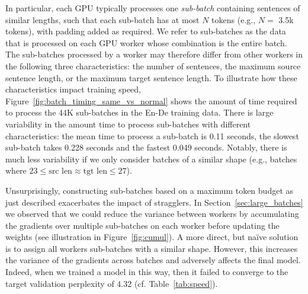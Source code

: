 \documentclass[11pt,a4paper]{article}
\begin{document}
In particular, each GPU typically processes one \emph{sub-batch} containing sentences of similar lengths, such that each sub-batch has at most $N$ tokens (e.g., $N =$ 3.5k tokens), with padding added as required. We refer to sub-batches as the data that is processed on each GPU worker whose combination is the entire batch.
The sub-batches processed by a worker may therefore differ from other workers in the following three characteristics: the number of sentences, the maximum source sentence length, or the maximum target sentence length.
To illustrate how these characteristics impact training speed, Figure~\ref{fig:batch_timing_same_vs_normal} shows the amount of time required to process the 44K sub-batches in the En-De training data.
There is large variability in the amount time to process sub-batches with different characteristics: the mean time to process a sub-batch is 0.11 seconds, the slowest sub-batch takes 0.228 seconds and the fastest 0.049 seconds.
Notably, there is much less variability if we only consider batches of a similar shape (e.g., batches where $23 \le \textrm{src len} \approx \textrm{tgt len} \le 27$).

Unsurprisingly, constructing sub-batches based on a maximum token budget as just described exacerbates the impact of stragglers.
In Section~\ref{sec:large_batches} we observed that we could reduce the variance between workers by accumulating the gradients over multiple sub-batches on each worker before updating the weights (see illustration in Figure~\ref{fig:cumul}).
A more direct, but na\"ive solution is to assign all workers sub-batches with a similar shape.
However, this increases the variance of the gradients across batches and adversely affects the final model.
Indeed, when we trained a model in this way, then it failed to converge to the target validation perplexity of 4.32 (cf. Table~\ref{tab:speed}).
\end{document}
